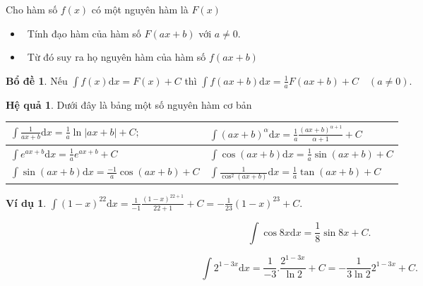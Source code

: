 \documentclass[12pt,a4paper,oneside]{book}
\theoremstyle{theorem}
\theoremstyle{definition}
\newtheorem{vd}[theorem2]{Ví dụ}
\newtheorem{bd}[theorem2]{Bổ đề}
\newtheorem{hq}[theorem2]{Hệ quả}
\begin{document}
Cho hàm số $f(x)$ có một nguyên hàm là $F(x)$
\begin{itemize}
\item \ Tính đạo hàm của hàm số $F(ax + b)$ với $a \neq 0$.

\item\ Từ đó suy ra họ nguyên hàm của hàm số $f(ax + b)$
\end{itemize}
\begin{bd}
    Nếu $\int f(x)\mathrm{d}x = F(x) + C$ thì $\int f(ax + b)\mathrm{d}x = \frac{1}{a}F(ax + b) + C \quad (a \neq 0)$.
\end{bd} 
\begin{hq} Dưới đây là bảng một số nguyên hàm cơ bản

\vspace{0.5cm}
\renewcommand{\arraystretch}{2}
\begin{tabular}{|l|l|}
\hline
$\displaystyle\int \frac{1}{ax + b}\mathrm{d}x = \frac{1}{a}\ln|ax + b| + C;$ & $\displaystyle\int (ax + b)^{\alpha}\mathrm{d}x = \frac{1}{a}\frac{(ax + b)^{\alpha+1}}{\alpha + 1} + C$ \\ \hline
$\displaystyle\int e^{ax+b}\mathrm{d}x = \frac{1}{a}e^{ax+b} + C$ & $\displaystyle\int \cos(ax + b)\mathrm{d}x = \frac{1}{a}\sin(ax + b) + C$ \\ \hline
$\displaystyle\int \sin(ax + b)\mathrm{d}x = \frac{-1}{a}\cos(ax + b) + C$ & $\displaystyle\int \frac{1}{\cos^2(ax + b)}\mathrm{d}x = \frac{1}{a}\tan(ax + b) + C$ \\ \hline
\end{tabular}
\end{hq}
\begin{vd}
    $\displaystyle\int (1-x)^{22}\mathrm{d}x = \frac{1}{-1}\frac{(1-x)^{22+1}}{22+1} + C = -\frac{1}{23}(1-x)^{23} + C.$

\[
\int \cos 8x \mathrm{d}x = \frac{1}{8}\sin 8x + C.
\]

\[
\int 2^{1-3x}\mathrm{d}x = \frac{1}{-3}.\frac{2^{1-3x}}{\ln 2} + C = -\frac{1}{3\ln 2}2^{1-3x} + C.
\]
\end{vd} 
\end{document}
